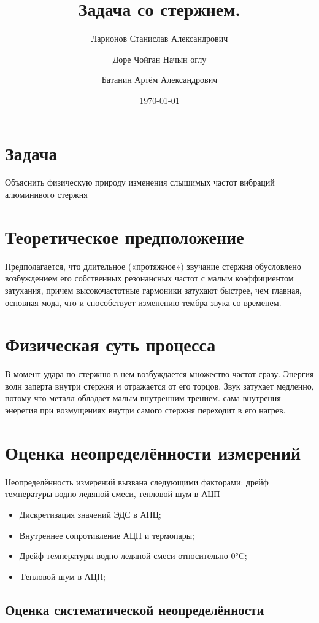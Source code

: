\documentclass[a4paper,12pt]{article}
\title{ Задача со стержнем.}
\author{Ларионов Станислав Александрович\and Доре Чойган Начын оглу \and Батанин Артём Александрович}
\date{\today}
\begin{document}
\maketitle

\newpage
\tableofcontents    
\newpage            


\section{Задача}
Объяснить физическую природу изменения слышимых частот вибраций алюминивого стержня



\section{Теоретическое предположение}

Предполагается, что длительное («протяжное») звучание стержня обусловлено возбуждением его собственных резонансных частот с малым коэффициентом затухания, причем высокочастотные гармоники затухают быстрее, чем главная, основная мода, что и способствует изменению тембра звука со временем.


\section{Физическая суть процесса}

В момент удара по стержню в нем возбуждается множество частот сразу. Энергия волн заперта внутри стержня и отражается от его торцов. Звук затухает медленно, потому что металл обладает малым внутренним трением. сама внутрення энерегия при возмущениях внутри самого стержня переходит в его нагрев.

\section{Оценка неопределённости измерений}
Неопределённость измерений вызвана следующими факторами:  дрейф температуры водно-ледяной смеси, тепловой шум в АЦП
\begin{itemize}[label={---}] 
    \item Дискретизация значений ЭДС в АПЦ;
    \item Внутреннее сопротивление АЦП и термопары;
    \item Дрейф температуры водно-ледяной смеси относительно 0°C;
    \item Tепловой шум в АЦП;
\end{itemize}
\subsection{Оценка систематической неопределённости}
\end{document}
